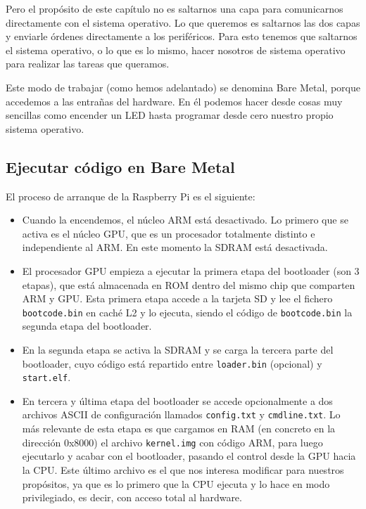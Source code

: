 Pero el propósito de este capítulo no es saltarnos una capa
para comunicarnos directamente con el sistema operativo. Lo que queremos
es saltarnos las dos capas y enviarle órdenes directamente a los periféricos.
Para esto tenemos que saltarnos el sistema operativo, o lo que es lo mismo,
hacer nosotros de sistema operativo para realizar las tareas que queramos.

Este modo de trabajar (como hemos adelantado) se denomina Bare Metal, porque
accedemos a las entrañas del hardware. En él podemos hacer desde cosas
muy sencillas como encender un LED hasta programar desde cero nuestro propio
sistema operativo.

\subsection{Ejecutar código en Bare Metal}

El proceso de arranque de la Raspberry Pi es el siguiente:

\begin{itemize}
  \item Cuando la encendemos, el núcleo ARM está desactivado. Lo primero que se activa es el
        núcleo GPU, que es un procesador totalmente distinto e independiente al ARM. En este
        momento la SDRAM está desactivada.
  \item El procesador GPU empieza a ejecutar la primera etapa del bootloader (son 3 etapas), que
        está almacenada en ROM dentro del mismo chip que comparten ARM y GPU. Esta primera etapa
        accede a la tarjeta SD y lee el fichero {\tt bootcode.bin} en caché L2 y lo ejecuta,
        siendo el código de {\tt bootcode.bin} la segunda etapa del bootloader.
  \item En la segunda etapa se activa la SDRAM y se carga la tercera parte del bootloader, cuyo
        código está repartido entre {\tt loader.bin} (opcional) y {\tt start.elf}.
  \item En tercera y última etapa del bootloader se accede opcionalmente a dos archivos ASCII de
        configuración llamados {\tt config.txt} y {\tt cmdline.txt}. Lo más relevante de esta
        etapa es que cargamos en RAM (en concreto en la dirección 0x8000) el archivo
        {\tt kernel.img} con código ARM, para luego ejecutarlo y acabar con el bootloader, pasando
        el control desde la GPU hacia la CPU.
        Este último archivo es el que nos interesa modificar para nuestros propósitos, ya que es
        lo primero que la CPU ejecuta y lo hace en modo privilegiado, es decir, con acceso total
        al hardware.
\end{itemize}

